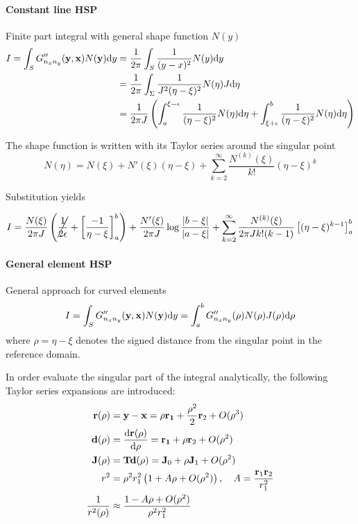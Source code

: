 \documentclass[a4paper,11pt]{article}
\newcommand{\td}{\mathrm{d}}
\begin{document}
\paragraph{Constant line HSP}

Finite part integral with general shape function $N(y)$
%
\begin{align}
	I = \int_S G''_{n_x n_y}({\bf y}, {\bf x}) N({\bf y}) \td y
	&= \frac{1}{2\pi} \int_S \frac{1}{(y-x)^2} N(y) \td y \\
	&= \frac{1}{2\pi} \int_\Sigma \frac{1}{J^2 (\eta-\xi)^2} N(\eta) J \td \eta \\
	&= \frac{1}{2\pi J} \left(
		\int_a^{\xi-\epsilon} \frac{1}{(\eta-\xi)^2} N(\eta) \td \eta
		+ \int_{\xi+\epsilon}^{b} \frac{1}{(\eta-\xi)^2} N(\eta) \td \eta
	\right)
\end{align}

The shape function is written with its Taylor series around the singular point
%
\begin{equation}
	N(\eta) = N(\xi) + N'(\xi) (\eta-\xi) + \sum_{k=2}^{\infty} \frac{N^{(k)}(\xi)}{k!}(\eta-\xi)^k
\end{equation}

Substitution yields

\begin{equation}
	I = \frac{N(\xi)}{2\pi J} \left(
		\cancel{\frac{1}{2\epsilon}} + \left[ \frac{-1}{\eta-\xi} \right]_{a}^{b} 
	\right)
	+
	\frac{N'(\xi)}{2\pi J} \log \frac{|b-\xi|}{|a-\xi|}
	+ \sum_{k=2}^{\infty} \frac{N^{(k)}(\xi)}{2\pi J k! (k-1)}
		\left[ (\eta-\xi)^{k-1} \right]_{a}^{b} 
\end{equation}

\paragraph{General element HSP}

General approach for curved elements
%
\begin{align}
	I = \int_S G''_{n_x n_y}({\bf y}, {\bf x}) N({\bf y}) \td y
	= \int_a^b G''_{n_x n_y}(\rho) N(\rho) J(\rho) \td \rho
\end{align}
%
where $\rho = \eta - \xi$ denotes the signed distance from the singular point in the reference domain.

In order evaluate the singular part of the integral analytically, the following Taylor series expansions are introduced:
\begin{align}
	{\bf r}(\rho) &= {\bf y} - {\bf x} = \rho {\bf r_1} + \frac{\rho^2}{2} {\bf r}_2 + O(\rho^3) \\
	{\bf d}(\rho) &= \frac{\td {\bf r}(\rho)}{\td \rho} = {\bf r_1} + \rho {\bf r}_2 + O(\rho^2)\\
	{\bf J}(\rho) &= {\bf T} {\bf d}(\rho) = {\bf J}_0 + \rho {\bf J}_1 + O(\rho^2) \\
	r^2 &= \rho^2 r_1^2 \left( 1 + A \rho + O(\rho^2) \right)
	,\quad A = \frac{{\bf r}_1 {\bf r}_2}{r_1^2} \\
	\frac{1}{r^2(\rho)} &\approx \frac{1 - A \rho + O(\rho^2)}{\rho^2 r_1^2}
\end{align}
\end{document}
